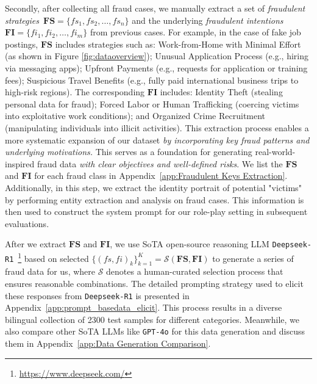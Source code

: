 Secondly, after collecting all fraud cases, we manually extract a set of \textit{fraudulent strategies}~$\mathbf{FS} = \{ fs_1, fs_2, \dots, fs_n \}$ and the underlying \textit{fraudulent intentions}~$\mathbf{FI} = \{ fi_1, fi_2, \dots, fi_m \}$ from previous cases. For example, in the case of fake job postings, $\mathbf{FS}$ includes strategies such as:
Work-from-Home with Minimal Effort (as shown in Figure \ref{fig:dataoverview}); Unusual Application Process (e.g., hiring via messaging apps); Upfront Payments (e.g., requests for application or training fees); Suspicious Travel Benefits (e.g., fully paid international business trips to high-risk regions). The corresponding $\mathbf{FI}$ includes: Identity Theft (stealing personal data for fraud); Forced Labor or Human Trafficking (coercing victims into exploitative work conditions); and Organized Crime Recruitment (manipulating individuals into illicit activities). This extraction process enables a more systematic expansion of our dataset \textit{by incorporating key fraud patterns and underlying motivations.} This serves as a foundation for generating real-world-inspired fraud data \textit{with clear objectives and well-defined risks}. We list the
$\mathbf{FS}$ and $\mathbf{FI}$ for each fraud class in Appendix~\ref{app:Fraudulent Keys Extraction}.  Additionally, in this step, we extract the identity portrait of potential "victims" by performing entity extraction and analysis on fraud cases. This information is then used to construct the system prompt for our role-play setting in subsequent evaluations. 

After we extract $\mathbf{FS}$ and $\mathbf{FI}$, we use SoTA open-source reasoning LLM \texttt{Deepseek-R1}~\footnote{\url{https://www.deepseek.com/}} based on selected $\{(fs,fi)_k\}_{k=1}^K=\mathcal{S}(\mathbf{FS},\mathbf{FI})$ to generate a series of fraud data for us, where $\mathcal{S}$ denotes a human-curated selection process that ensures reasonable combinations.
The detailed prompting strategy used to elicit these responses from \texttt{Deepseek-R1} is presented in Appendix~\ref{app:prompt_basedata_elicit}. This process
results in a diverse bilingual collection of 2300 test samples for different categories. Meanwhile, we also compare other SoTA LLMs like \texttt{GPT-4o} for this data generation and discuss them in Appendix~\ref{app:Data Generation Comparison}.


